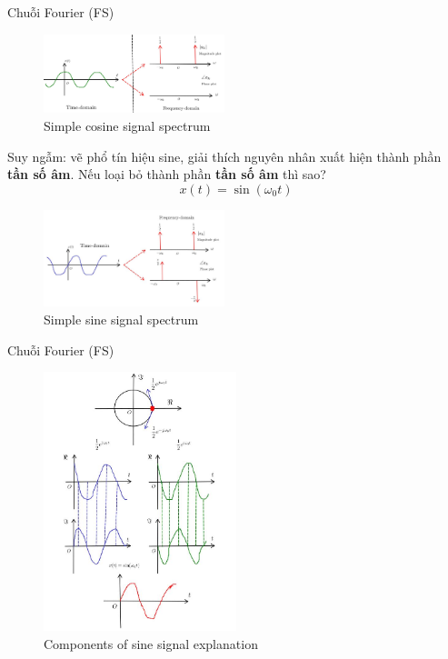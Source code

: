\documentclass[8pt]{beamer}
\begin{document}
\begin{frame}{Chuỗi Fourier (FS)}
\begin{figure}[h]
			\includegraphics[width=0.47\textwidth]{fre.jpg}
			\caption{Simple cosine signal spectrum}\label{fig:re11}

		\end{figure}

		Suy ngẫm: vẽ phổ tín hiệu sine, giải thích nguyên nhân xuất hiện thành phần \textbf{tần số âm}. Nếu loại bỏ thành phần \textbf{tần số âm} thì sao? 
$$x(t)=\sin{(\omega_{0}t)}$$
\begin{figure}[h]
			\includegraphics[width=0.47\textwidth]{sine.jpg}
			\caption{Simple sine signal spectrum}\label{fig:re11}

		\end{figure}


\end{frame}
\begin{frame}{Chuỗi Fourier (FS)}

\begin{figure}[h]
			\includegraphics[width=0.5\textwidth]{sin.jpg}
			\caption{Components of sine signal explanation}\label{fig:re11}

		\end{figure}
\end{frame}
\end{document}
